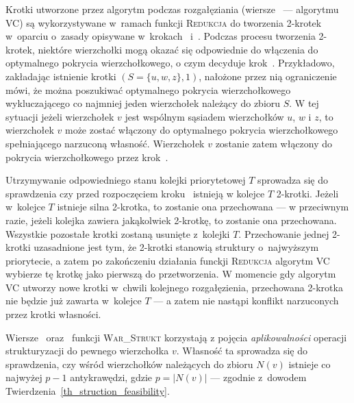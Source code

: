 \par{
  Krotki utworzone przez algorytm podczas rozgałęziania (wiersze~ ---  algorytmu \textsc{VC}) są wykorzystywane w~ramach funkcji \textsc{Redukcja} do tworzenia 2-krotek w~oparciu o~zasady opisywane w~krokach~ i~.
  Podczas procesu tworzenia 2-krotek, niektóre wierzchołki mogą okazać się odpowiednie do włączenia do optymalnego pokrycia wierzchołkowego, o czym decyduje krok~.
  Przykładowo, zakładając istnienie krotki $(S=\{u, w, z\}, 1)$, nałożone przez nią ograniczenie mówi, że można poszukiwać optymalnego pokrycia wierzchołkowego wykluczającego co najmniej jeden wierzchołek należący do zbioru $S$.
  W tej sytuacji jeżeli wierzchołek $v$ jest wspólnym sąsiadem wierzchołków $u$, $w$ i $z$, to wierzchołek $v$ może zostać włączony do optymalnego pokrycia wierzchołkowego spełniającego narzuconą własność.
  Wierzchołek $v$ zostanie zatem włączony do pokrycia wierzchołkowego przez krok~.

  Utrzymywanie odpowiedniego stanu kolejki priorytetowej $T$ sprowadza się do sprawdzenia czy przed rozpoczęciem kroku~ istnieją w kolejce $T$ 2-krotki.
  Jeżeli w~kolejce $T$ istnieje silna 2-krotka, to zostanie ona przechowana --- w przeciwnym razie, jeżeli kolejka zawiera jakąkolwiek 2-krotkę, to zostanie ona przechowana.
  Wszystkie pozostałe krotki zostaną usunięte z~kolejki $T$.
  Przechowanie jednej 2-krotki uzasadnione jest tym, że 2-krotki stanowią struktury o~najwyższym priorytecie, a zatem po zakończeniu działania funckji \textsc{Redukcja} algorytm \textsc{VC} wybierze tę krotkę jako pierwszą do przetworzenia.
  W momencie gdy algorytm \textsc{VC} utworzy nowe krotki w~chwili kolejnego rozgałęzienia, przechowana 2-krotka nie będzie już zawarta w~kolejce $T$ --- a zatem nie nastąpi konflikt narzuconych przez krotki własności.

  Wiersze~ oraz~ funkcji \textsc{War\_Strukt} korzystają z pojęcia \emph{aplikowalności} operacji strukturyzacji do pewnego wierzchołka $v$.
  Własność ta sprowadza się do sprawdzenia, czy wśród wierzchołków należących do zbioru $N(v)$ istnieje co najwyżej $p-1$ antykrawędzi, gdzie $p=|N(v)|$ --- zgodnie z~dowodem Twierdzenia~\ref{th_struction_feasibility}.
}
